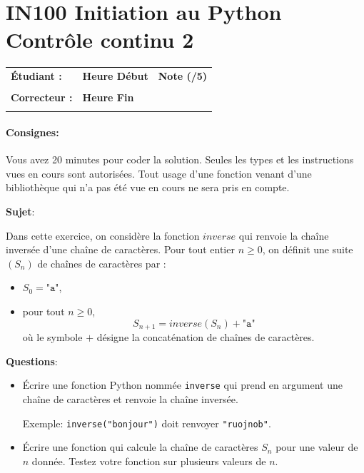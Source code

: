 \documentclass[a4paper,11pt]{article}
\begin{document}
\section*{\center IN100 Initiation au Python\\
Contrôle continu 2}

\vspace{0.5 cm}

\begin{table}[h!]
\centering
\renewcommand{\arraystretch}{1.4} %
\begin{tabular}{|p{10cm}|p{3cm}|p{2cm}|}
\hline
\textbf{Étudiant :} & \textbf{Heure Début }  & \textbf{Note (/5) }  \\
& & \\
\hline
\textbf{Correcteur :} & \textbf{Heure Fin } & \\
& & \\
\hline

\hline
\end{tabular}
\end{table}
\vspace{-0.4 cm}
\paragraph*{Consignes:} Vous avez 20 minutes pour coder la solution. Seules les types et les instructions vues en cours sont autorisées. Tout usage d'une fonction 
venant d'une bibliothèque qui n'a pas été vue en cours ne sera pris en compte. 

\vspace{0.5 cm}
\textbf{Sujet}: 

Dans cette exercice, on considère  la  fonction $inverse$ qui renvoie la chaîne inversée d'une chaîne de caractères. 
 Pour tout  entier $n\geq 0$, on définit une suite $(S_n)$  de chaînes de caractères par :
\begin{itemize}
    \item $S_0 = \texttt{"a"}$,
    \item pour tout $n \geq 0$,
    \[
    S_{n+1} = inverse(S_n) + \texttt{"a"} 
    \]
    où le symbole $+$ désigne la concaténation de chaînes de caractères. 
\end{itemize}

\vspace{0.5 cm}
\textbf{Questions}: 

\begin{itemize}
    \item[1.]  \'Ecrire une fonction  Python nommée \texttt{inverse} qui prend en argument une chaîne de caractères et renvoie la chaîne inversée. 
    
    \vspace{0.2 cm}
    
    Exemple: \texttt{inverse("bonjour")}  doit renvoyer  \texttt{"ruojnob"}. 
    
    \item[2.]  \'Ecrire une fonction qui calcule la chaîne de caractères $S_n$ pour une valeur de $n$ donnée. 
    Testez votre fonction sur plusieurs valeurs de $n$. 
    
    
        
\end{itemize}
\end{document}
